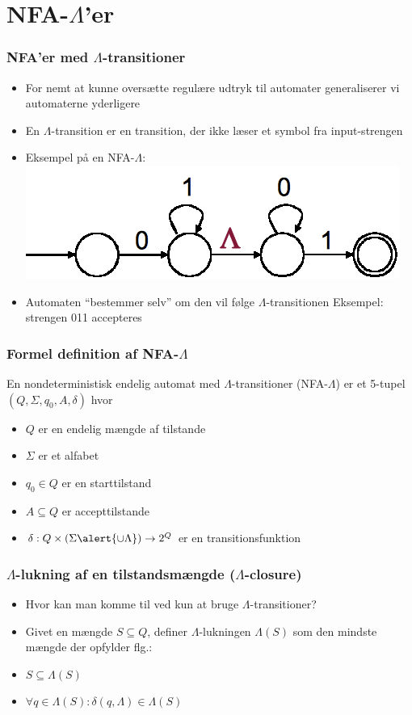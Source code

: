 \section{NFA-$\Lambda$’er}
\begin{frame}
  \frametitle{NFA'er med $\Lambda$-transitioner}
\begin{itemize}[<+->]
\item For nemt at kunne oversætte regulære udtryk til automater
  generaliserer vi automaterne yderligere
\item En $\Lambda$-transition er en transition, der ikke læser et
  symbol fra input-strengen
\item Eksempel på en NFA-$\Lambda$:
\includegraphics[scale=0.4]{images/2_seminar_nfalambda}
\item Automaten “bestemmer selv” om den vil følge 
$\Lambda$-transitionen
Eksempel: strengen 011 accepteres
\end{itemize}
\end{frame}
\begin{frame}
\frametitle{Formel definition af NFA-$\Lambda$}
En nondeterministisk endelig automat 
med $\Lambda$-transitioner (NFA-$\Lambda$) er 
et 5-tupel $(Q, \Sigma, q_0, A, \delta)$ hvor

\begin{itemize}[<+->]
\item $Q$ er en endelig mængde af tilstande
\item $\Sigma$ er et alfabet
\item $q_0\in Q$ er en starttilstand
\item $A\subseteq Q$ er accepttilstande
\item $\delta: Q\times (\Sigma \alert{\cup {\Lambda}})\rightarrow 2^Q$ er en
  transitionsfunktion
\end{itemize}
\end{frame}
\begin{frame}
\frametitle{$\Lambda$-lukning af en tilstandsmængde ($\Lambda$-closure)}
\begin{itemize}[<+->]
\item Hvor kan man komme til ved kun at bruge 
$\Lambda$-transitioner?
\item Givet en mængde $S\subseteq Q$, definer $\Lambda$-lukningen
  $\Lambda(S)$ som den mindste mængde der opfylder flg.: 
\item $S \subseteq \Lambda(S)$
\item $\forall q\in \Lambda(S): \delta(q, \Lambda) \in \Lambda(S)$
\end{itemize}
\end{frame}

